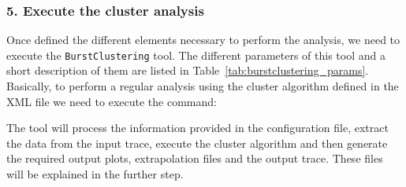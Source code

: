 \documentclass[twoside,a4,english,11pt]{book}
\begin{document}
\begin{table}
  
\end{table}

\subsubsection*{5. Execute the cluster analysis}

Once defined the different elements necessary to perform the analysis, we
need to execute the \texttt{BurstClustering} tool. The different parameters 
of this tool and a short description of them are listed in 
Table~\ref{tab:burstclustering_params}. Basically, to perform a regular 
analysis using the cluster algorithm defined in the XML file we need to 
execute the command:

\begin{figure}[!h]
  

\end{figure}

The tool will process the information provided in the configuration file,
extract the data from the input trace, execute the cluster algorithm and then
generate the required output plots, extrapolation files and the output trace.
These files will be explained in the further step.
\end{document}
